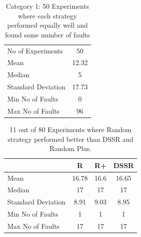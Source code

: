 \documentclass[conference]{IEEEtran}
\begin{document}



%
%

\begin{table}[H]
\caption{Category 1: 50 Experiments where each strategy performed equally well and found same number of faults}
\centering
\begin{tabular}{|l|c|}
\hline\hline
No of Experiments 	& 50  	\\
Mean  			& 12.32  	\\
Median 			& 5 		\\
Standard Deviation 	& 17.73  	\\
Min No of Faults	&  0  		\\
Max No of Faults 	& 96  	\\
\hline
\end{tabular}
\label{table:equal}
\end{table}






\begin{table}[H]
\caption{11 out of 80 Experiments where Random strategy performed better than DSSR and Random Plus.}
\centering
\begin{tabular}{|l|c|c|c|}
\hline\hline
 				& R			& R+				&  DSSR	\\
\hline
Mean  			&    16.78		&  16.6			&  16.65	\\
Median 			&    17    		&  17				&  17 	\\
Standard Deviation 	&    8.91		&  9.03			&  8.95	\\		
Min No of Faults	&    1			&  1				&  1\\
Max No of Faults 	&    17		&  17				& 17\\
\hline
\end{tabular}
\label{table:Randombetter}
\end{table}
\end{document}

